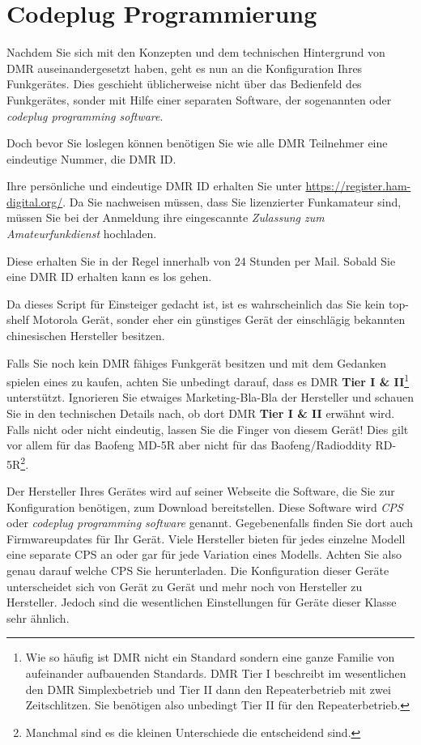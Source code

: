 \section{Codeplug Programmierung} \label{sec:codeplug}
Nachdem Sie sich mit den Konzepten und dem technischen Hintergrund von DMR auseinandergesetzt haben, geht es nun an die Konfiguration Ihres Funkgerätes. Dies geschieht üblicherweise nicht über das Bedienfeld des Funkgerätes, sonder mit Hilfe einer separaten Software, der sogenannten  oder \emph{codeplug programming software}. 

Doch bevor Sie loslegen können benötigen Sie wie alle DMR Teilnehmer eine eindeutige Nummer, die DMR ID.
\begin{hinweis}
 Ihre persönliche und eindeutige DMR ID erhalten Sie unter \url{https://register.ham-digital.org/}. Da Sie nachweisen müssen, dass Sie lizenzierter Funkamateur sind, müssen Sie bei der Anmeldung ihre eingescannte \emph{Zulassung zum Amateurfunkdienst} hochladen.
\end{hinweis}
Diese erhalten Sie in der Regel innerhalb von 24 Stunden per Mail. Sobald Sie eine DMR ID erhalten kann es los gehen.

Da dieses Script für Einsteiger gedacht ist, ist es wahrscheinlich das Sie kein top-shelf Motorola Gerät, sonder eher ein günstiges Gerät der einschlägig bekannten chinesischen Hersteller besitzen. 

\begin{achtung}
 Falls Sie noch kein DMR fähiges Funkgerät besitzen und mit dem Gedanken spielen eines zu kaufen, achten Sie unbedingt darauf, dass es DMR \textbf{Tier I \& II}\footnote{Wie so häufig ist DMR nicht ein Standard sondern eine ganze Familie von aufeinander aufbauenden Standards. DMR Tier I beschreibt im wesentlichen den DMR Simplexbetrieb und Tier II dann den Repeaterbetrieb mit zwei Zeitschlitzen. Sie benötigen also unbedingt Tier II für den Repeaterbetrieb.} unterstützt. Ignorieren Sie etwaiges Marketing-Bla-Bla der Hersteller und schauen Sie in den technischen Details nach, ob dort DMR \textbf{Tier I \& II} erwähnt wird. Falls nicht oder nicht eindeutig, lassen Sie die Finger von diesem Gerät! Dies gilt vor allem für das Baofeng MD-5R aber nicht für das Baofeng/Radioddity RD-5R\footnote{Manchmal sind es die kleinen Unterschiede die entscheidend sind.}. 
\end{achtung}

Der Hersteller Ihres Gerätes wird auf seiner Webseite die Software, die Sie zur Konfiguration benötigen, zum Download bereitstellen. Diese Software wird \emph{CPS} oder \emph{codeplug programming software} genannt. Gegebenenfalls finden Sie dort auch Firmwareupdates für Ihr Gerät. Viele Hersteller bieten für jedes einzelne Modell eine separate CPS an oder gar für jede Variation eines Modells. Achten Sie also genau darauf welche CPS Sie herunterladen. Die Konfiguration dieser Geräte unterscheidet sich von Gerät zu Gerät und mehr noch von Hersteller zu Hersteller. Jedoch sind die wesentlichen Einstellungen für Geräte dieser Klasse sehr ähnlich.

